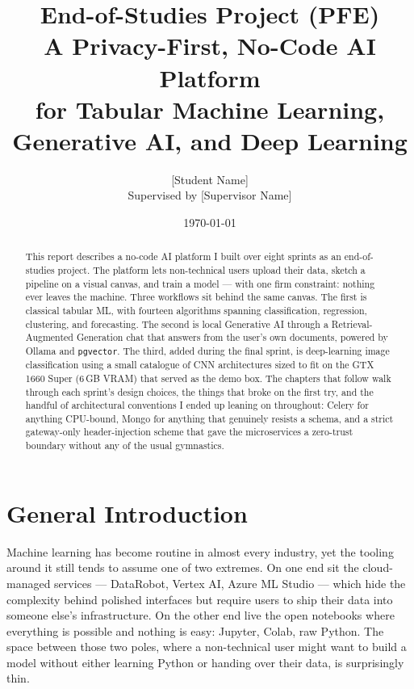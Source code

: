 \documentclass[12pt, a4paper]{report}
\title{End-of-Studies Project (PFE)\\[6pt] \Large A Privacy-First, No-Code AI Platform\\ \large for Tabular Machine Learning, Generative AI, and Deep Learning}
\author{[Student Name]\\ \small Supervised by [Supervisor Name]}
\date{\today}
\begin{document}
\maketitle

\begin{abstract}
This report describes a no-code AI platform I built over eight sprints as an
end-of-studies project. The platform lets non-technical users upload their
data, sketch a pipeline on a visual canvas, and train a model --- with one
firm constraint: nothing ever leaves the machine. Three workflows sit
behind the same canvas. The first is classical tabular ML, with fourteen
algorithms spanning classification, regression, clustering, and
forecasting. The second is local Generative AI through a
Retrieval-Augmented Generation chat that answers from the user's own
documents, powered by Ollama and \texttt{pgvector}. The third, added
during the final sprint, is deep-learning image classification using a
small catalogue of CNN architectures sized to fit on the GTX 1660 Super
(6\,GB VRAM) that served as the demo box. The chapters that follow walk
through each sprint's design choices, the things that broke on the first
try, and the handful of architectural conventions I ended up leaning on
throughout: Celery for anything CPU-bound, Mongo for anything that
genuinely resists a schema, and a strict gateway-only header-injection
scheme that gave the microservices a zero-trust boundary without any of
the usual gymnastics.
\end{abstract}

\tableofcontents
\newpage

\chapter*{General Introduction}

Machine learning has become routine in almost every industry, yet the
tooling around it still tends to assume one of two extremes. On one end
sit the cloud-managed services --- DataRobot, Vertex AI, Azure ML
Studio --- which hide the complexity behind polished interfaces but
require users to ship their data into someone else's infrastructure. On
the other end live the open notebooks where everything is possible and
nothing is easy: Jupyter, Colab, raw Python. The space between those two
poles, where a non-technical user might want to build a model without
either learning Python or handing over their data, is surprisingly thin.
\end{document}
